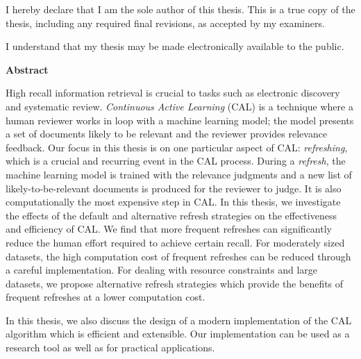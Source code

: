 \cleardoublepage %

 
  \noindent
I hereby declare that I am the sole author of this thesis. This is a true copy of the thesis, including any required final revisions, as accepted by my examiners.

  \bigskip
  
  \noindent
I understand that my thesis may be made electronically available to the public.

\cleardoublepage


\begin{center}\textbf{Abstract}\end{center}
High recall information retrieval is crucial to tasks such as electronic
discovery and systematic review. \textit{Continuous Active Learning} (CAL) is a
technique where a human reviewer works in loop with a machine learning model; the
model presents a set of documents likely to be relevant and the reviewer
provides relevance feedback. Our focus in this thesis is on one particular aspect
of CAL:  \textit{refreshing}, which is a crucial and recurring event in the CAL
process.  During a \textit{refresh}, the machine learning model is trained with
the relevance judgments and a new list of likely-to-be-relevant documents is
produced for the reviewer to judge. It is also computationally the most
expensive step in CAL. In this thesis, we investigate the effects of the default
and alternative refresh strategies on the effectiveness and efficiency of CAL.
We find that more frequent refreshes can significantly reduce the human effort
required to achieve certain recall. For moderately sized datasets, the high
computation cost of frequent refreshes can be reduced through a careful
implementation. For dealing with resource constraints and large datasets, we
propose alternative refresh strategies which provide the benefits of frequent
refreshes at a lower computation cost.

In this thesis, we also discuss the design of a modern implementation of the CAL
algorithm which is efficient and extensible. Our implementation can be used as a
research tool as well as for practical applications.

